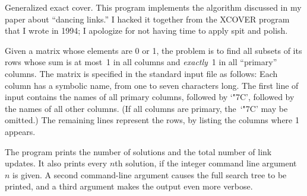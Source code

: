 
\datethis

Generalized exact cover.
This program implements the algorithm discussed in my paper about ``dancing
links.'' I hacked it together from the {\mc XCOVER} program that I wrote in
1994; I apologize for not having time to apply spit and polish.

Given a matrix whose elements are 0 or 1, the problem is to
find all subsets of its rows whose sum is at most~1 in all columns and
{\it exactly\/}~1 in all ``primary'' columns. The matrix is specified
in the standard input file as follows: Each column has a symbolic name,
from one to seven characters long. The first line of input contains
the names of all primary columns, followed by `\.{\char"7C}', followed by
the names of all other columns.
(If all columns are primary, the~`\.{\char"7C}' may be omitted.)
The remaining lines represent the rows, by listing the columns where 1 appears.

The program prints the number of solutions and the total number of link
updates. It also prints every $n$th solution, if the integer command
line argument $n$ is given. A second command-line argument causes the
full search tree to be printed, and a third argument makes the output
even more verbose.

